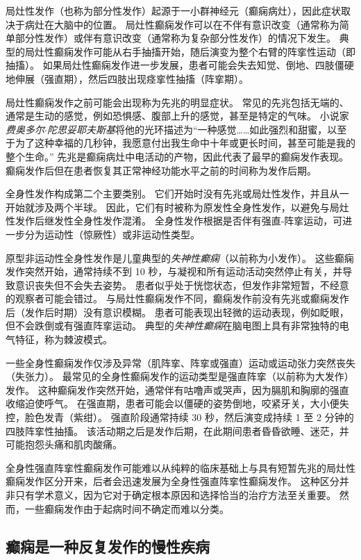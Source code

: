 局灶性发作（也称为部分性发作）起源于一小群神经元（癫痫病灶），因此症状取决于病灶在大脑中的位置。
局灶性癫痫发作可以在不伴有意识改变（通常称为简单部分性发作）或伴有意识改变（通常称为复杂部分性发作）的情况下发生。
典型的局灶性癫痫发作可能从右手抽搐开始，随后演变为整个右臂的阵挛性运动（即抽搐）。
如果局灶性癫痫发作进一步发展，患者可能会失去知觉、倒地、四肢僵硬地伸展（强直期），然后四肢出现痉挛性抽搐（阵挛期）。


局灶性癫痫发作之前可能会出现称为先兆的明显症状。
常见的先兆包括无端的、通常是生动的感觉，例如恐惧感、腹部上升的感觉，甚至是特定的气味。
小说家\textit{费奥多尔$\cdot$陀思妥耶夫斯基}将他的光环描述为“一种感觉……如此强烈和甜蜜，以至于为了这种幸福的几秒钟，我愿意付出我生命中十年或更长时间，甚至可能是我的整个生命。” 
先兆是癫痫病灶中电活动的产物，因此代表了最早的癫痫发作表现。
癫痫发作后但在患者恢复其正常神经功能水平之前的时间称为发作后期。


全身性发作构成第二个主要类别。
它们开始时没有先兆或局灶性发作，并且从一开始就涉及两个半球。
因此，它们有时被称为原发性全身性发作，以避免与局灶性发作后继发性全身性发作混淆。
全身性发作根据是否伴有强直-阵挛运动，可进一步分为运动性（惊厥性）或非运动性类型。


原型非运动性全身性发作是儿童典型的\textit{失神性癫痫}（以前称为小发作）。
这些癫痫发作突然开始，通常持续不到 10 秒，与凝视和所有运动活动突然停止有关，并导致意识丧失但不会失去姿势。
患者似乎处于恍惚状态，但发作非常短暂，不经意的观察者可能会错过。
与局灶性癫痫发作不同，癫痫发作前没有先兆或癫痫发作后（发作后时期）没有意识模糊。
患者可能表现出轻微的运动表现，例如眨眼，但不会跌倒或有强直阵挛运动。
典型的\textit{失神性癫痫}在脑电图上具有非常独特的电气特征，称为棘波模式。


一些全身性癫痫发作仅涉及异常（肌阵挛、阵挛或强直）运动或运动张力突然丧失（失张力）。
最常见的全身性癫痫发作的运动类型是强直阵挛（以前称为大发作）发作。
这种癫痫发作突然开始，通常伴有咕噜声或哭声，因为膈肌和胸廓的强直收缩迫使呼气。
在强直期，患者可能会以僵硬的姿势倒地，咬紧牙关，大小便失控，脸色发青（紫绀）。
强直阶段通常持续 30 秒，然后演变成持续 1 至 2 分钟的四肢阵挛性抽搐。
该活动期之后是发作后期，在此期间患者昏昏欲睡、迷茫，并可能抱怨头痛和肌肉酸痛。


全身性强直阵挛性癫痫发作可能难以从纯粹的临床基础上与具有短暂先兆的局灶性癫痫发作区分开来，后者会迅速发展为全身性强直阵挛性癫痫发作。
这种区分并非只有学术意义，因为它对于确定根本原因和选择恰当的治疗方法至关重要。
然而，一些癫痫发作由于起病时间不确定而难以分类。



\subsection{癫痫是一种反复发作的慢性疾病}

